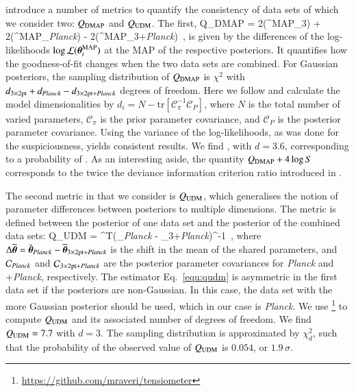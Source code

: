 \citet{Raveri2019} introduce a number of metrics to quantify the consistency of data sets of which we consider two: $Q_{\rm DMAP}$ and $Q_{\rm UDM}$. 
The first,
\be
	Q_{\rm DMAP} =  2\log{}(\vec\theta^{\rm MAP}_{\rm 3}) + 2\log{}(\vec\theta^{\rm MAP}_{\it Planck}) - 2\log{}(\vec\theta^{\rm MAP}_{{\rm 3+}{\it Planck}}) \,,
\ee
is given by the differences of the log-likelihoods $\log\mathcal{L}(\vec\theta^{\rm MAP}_{i})$ at the MAP of the respective posteriors. 
It quantifies how the goodness-of-fit changes when the two data sets are combined. 
For Gaussian posteriors, the sampling distribution of $Q_{\rm DMAP}$ is $\chi^{2}$ with $d_{\rm 3\times2pt} + d_{\it Planck} - d_{{\rm 3\times2pt+}{\it Planck}}$ degrees of freedom. 
Here we follow \citet{Raveri2019} and calculate the model dimensionalities by $d_{i} = N - \mathrm{tr}[\mathcal{C}_{\pi}^{-1}\mathcal{C}_{P}]$, where $N$ is the total number of varied parameters, $\mathcal{C}_{\pi}$ is the prior parameter covariance, and $\mathcal{C}_{P}$ is the posterior parameter covariance. 
Using the variance of the log-likelihoods, as was done for the suspiciousness, yields consistent results.
We find , with $d=3.6$, corresponding to a probability of . 
As an interesting aside, the quantity $Q_{\rm DMAP} + 4\log S$ corresponds to the twice the deviance information criterion ratio introduced in \citet{Joudaki2017}.

The second metric in \citet{Raveri2019} that we consider is $Q_{\rm UDM}$, which generalises the notion of parameter differences between posteriors to multiple dimensions. 
The metric is defined between the posterior of one data set and the posterior of the combined data sets:
\be
\label{equ:qudm}
	Q_{\rm UDM} = \Delta\overline{\vec\theta}^{T}(_{\it Planck} - _{{\rm 3+}{\it Planck}})^{-1}\Delta\overline{\vec\theta} \,,
\ee
where $\Delta\overline{\vec\theta} = \bar{\vec\theta}_{\it Planck} - \overline{\vec\theta}_{{\rm 3\times2pt+}{\it Planck}}$ is the shift in the mean of the shared parameters, and $\mathcal{C}_{\it Planck}$ and $\mathcal{C}_{{\rm 3\times2pt+}{\it Planck}}$ are the posterior parameter covariances for {\it Planck} and \tttp+{\it Planck}, respectively. 
The estimator Eq.~\eqref{equ:qudm} is asymmetric in the first data set if the posteriors are non-Gaussian. 
In this case, the data set with the more Gaussian posterior should be used, which in our case is {\it Planck}. 
We use \footnote{\url{https://github.com/mraveri/tensiometer}} to compute $Q_{\rm UDM}$ and its associated number of degrees of freedom. 
We find $Q_{\rm UDM} = 7.7$ with $d = 3$. The sampling distribution is approximated by $\chi^{2}_{d}$, such that the probability of the observed value of $Q_{\rm UDM} $ is $0.054$, or $1.9\,\sigma$. 

